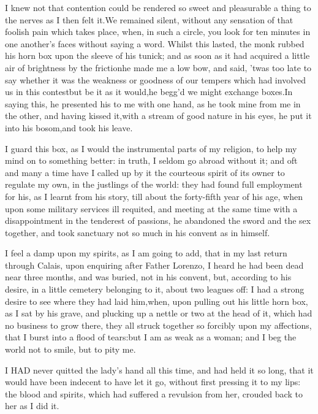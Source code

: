 \documentclass[twoside]{article}
\begin{document}
I knew not that contention could be rendered so sweet and pleasurable a
thing to the nerves as I then felt it.\tsk We remained silent, without any
sensation of that foolish pain which takes place, when, in such a circle,
you look for ten minutes in one another’s faces without saying a word.
Whilst this lasted, the monk rubbed his horn box upon the sleeve of his
tunick; and as soon as it had acquired a little air of brightness by the
friction\tsk he made me a low bow, and said, ’twas too late to say whether it
was the weakness or goodness of our tempers which had involved us in this
contest\tsk but be it as it would,\tsk he begg’d we might exchange boxes.\tsk In
saying this, he presented his to me with one hand, as he took mine from
me in the other, and having kissed it,\tsk with a stream of good nature in
his eyes, he put it into his bosom,\tsk and took his leave.

I guard this box, as I would the instrumental parts of my religion, to
help my mind on to something better: in truth, I seldom go abroad without
it; and oft and many a time have I called up by it the courteous spirit
of its owner to regulate my own, in the justlings of the world: they had
found full employment for his, as I learnt from his story, till about the
forty-fifth year of his age, when upon some military services ill
requited, and meeting at the same time with a disappointment in the
tenderest of passions, he abandoned the sword and the sex together, and
took sanctuary not so much in his convent as in himself.

I feel a damp upon my spirits, as I am going to add, that in my last
return through Calais, upon enquiring after Father Lorenzo, I heard he
had been dead near three months, and was buried, not in his convent, but,
according to his desire, in a little cemetery belonging to it, about two
leagues off: I had a strong desire to see where they had laid him,\tsk when,
upon pulling out his little horn box, as I sat by his grave, and plucking
up a nettle or two at the head of it, which had no business to grow
there, they all struck together so forcibly upon my affections, that I
burst into a flood of tears:\tsk but I am as weak as a woman; and I beg the
world not to smile, but to pity me.






I HAD never quitted the lady’s hand all this time, and had held it so
long, that it would have been indecent to have let it go, without first
pressing it to my lips: the blood and spirits, which had suffered a
revulsion from her, crouded back to her as I did it.
\end{document}
